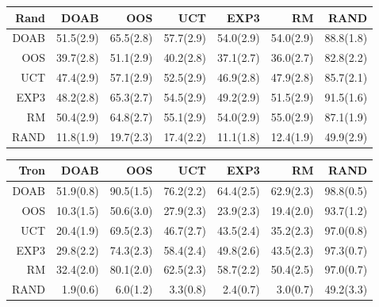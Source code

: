 \begin{figure}
\begin{scriptsize}
\begin{tabular}{|r|rrrrrr|}
\end{tabular}
\begin{tabular}{|r|rrrrrr|}\hline
Rand&DOAB&OOS&UCT&EXP3&RM&RAND\\\hline
DOAB&51.5(2.9)&65.5(2.8)&57.7(2.9)&54.0(2.9)&54.0(2.9)&88.8(1.8)\\
OOS&39.7(2.8)&51.1(2.9)&40.2(2.8)&37.1(2.7)&36.0(2.7)&82.8(2.2)\\
UCT&47.4(2.9)&57.1(2.9)&52.5(2.9)&46.9(2.8)&47.9(2.8)&85.7(2.1)\\
EXP3&48.2(2.8)&65.3(2.7)&54.5(2.9)&49.2(2.9)&51.5(2.9)&91.5(1.6)\\
RM&50.4(2.9)&64.8(2.7)&55.1(2.9)&54.0(2.9)&55.0(2.9)&87.1(1.9)\\
RAND&11.8(1.9)&19.7(2.3)&17.4(2.2)&11.1(1.8)&12.4(1.9)&49.9(2.9)\\
\hline
\end{tabular}
\begin{tabular}{|r|rrrrrr|}\hline
Tron&DOAB&OOS&UCT&EXP3&RM&RAND\\\hline
DOAB&51.9(0.8)&90.5(1.5)&76.2(2.2)&64.4(2.5)&62.9(2.3)&98.8(0.5)\\
OOS&10.3(1.5)&50.6(3.0)&27.9(2.3)&23.9(2.3)&19.4(2.0)&93.7(1.2)\\
UCT&20.4(1.9)&69.5(2.3)&46.7(2.7)&43.5(2.4)&35.2(2.3)&97.0(0.8)\\
EXP3&29.8(2.2)&74.3(2.3)&58.4(2.4)&49.8(2.6)&43.5(2.3)&97.3(0.7)\\
RM&32.4(2.0)&80.1(2.0)&62.5(2.3)&58.7(2.2)&50.4(2.5)&97.0(0.7)\\
RAND&1.9(0.6)&6.0(1.2)&3.3(0.8)&2.4(0.7)&3.0(0.7)&49.2(3.3)\\
\hline
\end{tabular}
\begin{tabular}{|r|rrrrrr|}\hline

\end{tabular}
\end{scriptsize}
\end{figure}
